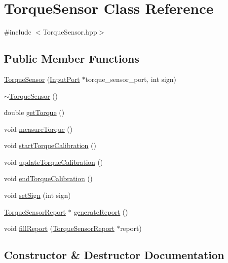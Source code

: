 \hypertarget{classTorqueSensor}{}\section{Torque\+Sensor Class Reference}
\label{classTorqueSensor}


{\ttfamily \#include $<$Torque\+Sensor.\+hpp$>$}

\subsection*{Public Member Functions}
\begin{DoxyCompactItemize}
\item 
\hyperlink{classTorqueSensor_a86c16a3b5c03bda4fe800f69ca100ffd}{Torque\+Sensor} (\hyperlink{classInputPort}{Input\+Port} $\ast$torque\+\_\+sensor\+\_\+port, int sign)
\item 
\hyperlink{classTorqueSensor_ac4229a1967a7b2f0f505e2f23de2066f}{$\sim$\+Torque\+Sensor} ()
\item 
double \hyperlink{classTorqueSensor_a3afc8fb178c7d1a59b3530b8efaeecf8}{get\+Torque} ()
\item 
void \hyperlink{classTorqueSensor_a24a87ac7ab3b1d96326f177828389f89}{measure\+Torque} ()
\item 
void \hyperlink{classTorqueSensor_a796181d1f45a39cd0a5336c9603901c0}{start\+Torque\+Calibration} ()
\item 
void \hyperlink{classTorqueSensor_a528c05b0f813773ae3b5b85bb423a0f8}{update\+Torque\+Calibration} ()
\item 
void \hyperlink{classTorqueSensor_a22681177bea96f7eb3dc8b6b811bd736}{end\+Torque\+Calibration} ()
\item 
void \hyperlink{classTorqueSensor_a2217c097b770a533ea02c51958132550}{set\+Sign} (int sign)
\item 
\hyperlink{classTorqueSensorReport}{Torque\+Sensor\+Report} $\ast$ \hyperlink{classTorqueSensor_a30405ad1b718e6e91ee9e43a15c004b7}{generate\+Report} ()
\item 
void \hyperlink{classTorqueSensor_a51ac64b6d6920034127c1f705882bf3a}{fill\+Report} (\hyperlink{classTorqueSensorReport}{Torque\+Sensor\+Report} $\ast$report)
\end{DoxyCompactItemize}


\subsection{Constructor \& Destructor Documentation}
